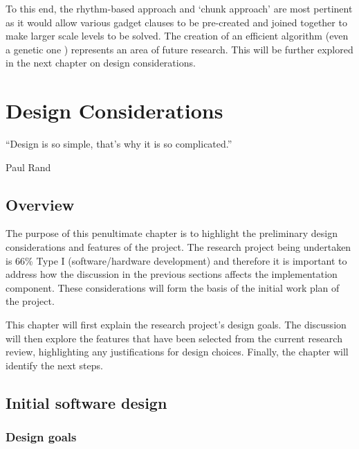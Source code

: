 \documentclass[11pt, a4paper, oneside]{report} %
\begin{document}
To this end, the rhythm-based approach \cite{compton2006procedural,Smith:2009:RLG:1536513.1536548}
and `chunk approach' \cite{mawhorter2010procedural} are most pertinent as it would allow various
gadget clauses to be pre-created and joined together to make larger scale levels to be solved. The
creation of an efficient algorithm (even a genetic one \cite{mourato2011automatic}) represents an
area of future research. This will be further explored in the next chapter on design considerations.



\chapter{Design Considerations}

\epigraph{``Design is so simple, that's why it is so complicated.''}{Paul Rand}

\section{Overview}

The purpose of this penultimate chapter is to highlight the preliminary design considerations and
features of the project. The research project being undertaken is 66\% Type I (software/hardware
development) and therefore it is important to address how the discussion in the previous sections
affects the implementation component. These considerations will form the basis of the initial work
plan of the project. 

This chapter will first explain the research project's design goals. The discussion will then
explore the features that have been selected from the current research review, highlighting any
justifications for design choices. Finally, the chapter will identify the next steps.

\section{Initial software design}

\subsection{Design goals}
\end{document}

